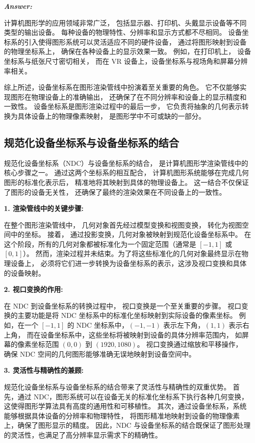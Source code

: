 \documentclass[12pt]{article}
\newenvironment{Answer}{
  \vspace{12pt}
  {\large\textbf{\textit{\hspace{-12pt}Answer:}}}\par
  \vspace{8pt}
} {\vspace{24pt}}
\begin{document}
\begin{Answer}
计算机图形学的应用领域非常广泛，
包括显示器、打印机、头戴显示设备等不同类型的输出设备。
每种设备的物理特性、分辨率和显示方式都不尽相同。
设备坐标系的引入使得图形系统可以灵活适应不同的硬件设备，
通过将图形映射到设备的物理坐标系上，
确保在各种设备上的显示效果一致。
例如，在打印机上，
设备坐标系与纸张尺寸密切相关，
而在 VR 设备上，设备坐标系与视场角和屏幕分辨率相关。

综上所述，设备坐标系在图形渲染管线中扮演着至关重要的角色。
它不仅能够实现图形在物理设备上的准确输出，
还确保了在不同分辨率和设备上的显示精度和一致性。
设备坐标系是图形渲染过程中的最后一步，
它负责将抽象的几何表示转换为具体设备上的物理像素映射，
是图形学中不可或缺的一部分。

\subsection*{规范化设备坐标系与设备坐标系的结合}
\noindent

规范化设备坐标系（NDC）与设备坐标系的结合，
是计算机图形学渲染管线中的核心步骤之一。
通过这两个坐标系的相互配合，
计算机图形系统能够在完成几何图形的标准化表示后，
精准地将其映射到具体的物理设备上。
这一结合不仅保证了图形的设备无关性，
还确保了最终的渲染效果在不同设备上的一致性。

\noindent\textbf{1. 渲染管线中的关键步骤:}

在整个图形渲染管线中，
几何对象首先经过模型变换和视图变换，
转化为视图空间中的坐标。
接着，
通过投影变换，几何对象被映射到规范化设备坐标系中。
在这个阶段，所有的几何对象都被标准化为一个固定范围（通常是 $[-1, 1]$ 或 $[0, 1]$）。
然而，渲染过程并未结束。为了将这些标准化的几何对象最终显示在物理设备上，
必须将它们进一步转换为设备坐标系的表示，这涉及视口变换和具体的设备映射。

\noindent\textbf{2. 视口变换的作用:}

在 NDC 到设备坐标系的转换过程中，
视口变换是一个至关重要的步骤。
视口变换的主要功能是将 NDC 坐标系中的标准化坐标映射到实际设备的像素坐标。
例如，在一个 $[-1, 1]$ 的 NDC 坐标系中，$(-1, -1)$ 表示左下角，$(1, 1)$ 表示右上角，
而在设备坐标系中，这些坐标将被映射到设备的具体分辨率范围内，
如屏幕的像素坐标范围 $(0, 0)$ 到 $(1920, 1080)$。
视口变换通过缩放和平移操作，
确保 NDC 空间的几何图形能够准确无误地映射到设备空间中。

\noindent\textbf{3. 灵活性与精确性的兼顾:}

规范化设备坐标系与设备坐标系的结合带来了灵活性与精确性的双重优势。
首先，通过 NDC，图形系统可以在设备无关的标准化坐标系下执行各种几何变换，
这使得图形学算法具有高度的通用性和可移植性。
其次，通过设备坐标系，系统能够根据具体设备的分辨率和物理特性，
将图形精准地映射到设备的物理像素上，确保了图形显示的精度。
因此，NDC 与设备坐标系的结合既保证了图形处理的灵活性，也满足了高分辨率显示需求下的精确性。


\end{Answer}
\end{document}
